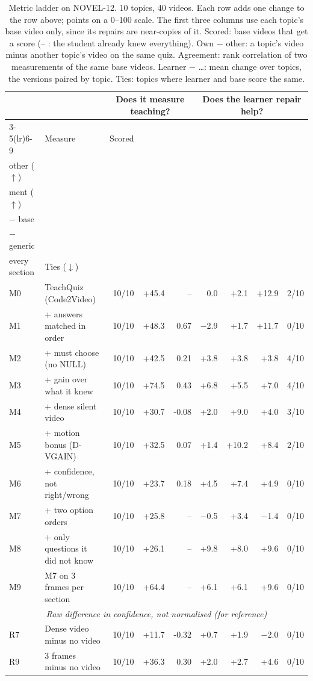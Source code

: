 \begin{table}[t]\centering\footnotesize
\caption{Metric ladder on NOVEL-12. 10 topics, 40 videos. Each row adds one change to the row above; points on a 0--100 scale. The first three columns use each topic's base video only, since its repairs are near-copies of it. Scored: base videos that get a score (-- : the student already knew everything). Own $-$ other: a topic's video minus another topic's video on the same quiz. Agreement: rank correlation of two measurements of the same base videos. Learner $-$ \ldots: mean change over topics, the versions paired by topic. Ties: topics where learner and base score the same.}\label{tab:ladder_novel}
\setlength{\tabcolsep}{4pt}\begin{tabular}{@{}llrrrrrrr@{}}\toprule & & \multicolumn{3}{c}{Does it measure teaching?} & \multicolumn{4}{c}{Does the learner repair help?}\\
\cmidrule(lr){3-5}\cmidrule(lr){6-9}
& Measure & Scored & \hd{Own $-$\\other ($\uparrow$)} & \hd{Agree-\\ment ($\uparrow$)} & \hd{Learner\\$-$ base} & \hd{Learner\\$-$ generic} & \hd{Learner $-$\\every section} & Ties ($\downarrow$)\\\midrule
M0 & TeachQuiz (Code2Video) & 10/10 & +45.4 & -- & 0.0 & +2.1 & +12.9 & 2/10 \\
M1 & + answers matched in order & 10/10 & +48.3 & 0.67 & $-$2.9 & +1.7 & +11.7 & 0/10 \\
M2 & + must choose (no NULL) & 10/10 & +42.5 & 0.21 & +3.8 & +3.8 & +3.8 & 4/10 \\
M3 & + gain over what it knew & 10/10 & +74.5 & 0.43 & +6.8 & +5.5 & +7.0 & 4/10 \\
M4 & + dense silent video & 10/10 & +30.7 & -0.08 & +2.0 & +9.0 & +4.0 & 3/10 \\
M5 & + motion bonus (D-VGAIN) & 10/10 & +32.5 & 0.07 & +1.4 & +10.2 & +8.4 & 2/10 \\
M6 & + confidence, not right/wrong & 10/10 & +23.7 & 0.18 & +4.5 & +7.4 & +4.9 & 0/10 \\
M7 & + two option orders & 10/10 & +25.8 & -- & $-$0.5 & +3.4 & $-$1.4 & 0/10 \\
M8 & + only questions it did not know & 10/10 & +26.1 & -- & +9.8 & +8.0 & +9.6 & 0/10 \\
M9 & M7 on 3 frames per section & 10/10 & +64.4 & -- & +6.1 & +6.1 & +9.6 & 0/10 \\
\midrule
\multicolumn{9}{c}{\textit{Raw difference in confidence, not normalised (for reference)}}\\
R7 & Dense video minus no video & 10/10 & +11.7 & -0.32 & +0.7 & +1.9 & $-$2.0 & 0/10 \\
R9 & 3 frames minus no video & 10/10 & +36.3 & 0.30 & +2.0 & +2.7 & +4.6 & 0/10 \\
\bottomrule\end{tabular}
\end{table}
